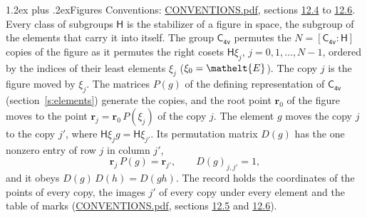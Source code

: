 \documentclass[10pt,a4paper]{article}
\makeatletter
\renewcommand\section{\@startsection{section}{1}{\z@}{-3ex plus -1ex minus -.2ex}%
  {1.2ex plus .2ex}{\normalfont\large\sffamily\bfseries\color{parttitle}}}
\numberwithin{equation}{section}
\newcommand{\eltfont}[1]{{\let\sigma\eltsigma\mathelt{#1}}}
\newcommand{\grp}[1]{\mathsf{#1}}
\newcommand{\cls}[1]{\eltfont{#1}}
\newcommand{\pointr}{\mathbf{r}}
\makeatother
\begin{document}
\section{Figures}\label{s:permutation}
Conventions: \href{../../CONVENTIONS.pdf}{CONVENTIONS.pdf}, sections \href{../../CONVENTIONS.pdf\#conv.12.4}{12.4} to \href{../../CONVENTIONS.pdf\#conv.12.6}{12.6}.
Every class of subgroups $\grp{H}$ is the stabilizer of a figure in space, the subgroup of the elements that carry it into itself. \label{n:local.orbit.size}\label{n:element.coset.least}\label{n:index.coset}The group $\grp{C_{4v}}$ permutes the $N = [\grp{C_{4v}} : \grp{H}]$ copies of the figure as it permutes the right cosets $\grp{H}\xi_j$, $j = 0, 1, \dots, N - 1$, ordered by the indices of their least elements $\xi_j$ ($\xi_0 = \cls{E}$). The copy $j$ is the figure moved by $\xi_j$. The matrices $P(g)$ of the defining representation of $\grp{C_{4v}}$ (section~\ref{s:elements}) generate the copies, and the root point $\pointr_0$ of the figure moves to the point $\pointr_j = \pointr_0\, P(\xi_j)$ of the copy $j$. \label{n:local.coset.image}The element $g$ moves the copy $j$ to the copy $j'$, where $\grp{H}\xi_j g = \grp{H}\xi_{j'}$. \label{n:local.matrix.permutation}Its permutation matrix $D(g)$ has the one nonzero entry of row $j$ in column $j'$,
\begin{equation}\label{e:perm.matrix}\pointr_j\, P(g) = \pointr_{j'}, \qquad D(g)_{j,j'} = 1,\end{equation}
and it obeys $D(g)\, D(h) = D(gh)$. The record holds the coordinates of the points of every copy, the images $j'$ of every copy under every element and the table of marks (\href{../../CONVENTIONS.pdf}{CONVENTIONS.pdf}, sections \href{../../CONVENTIONS.pdf\#conv.12.5}{12.5} and \href{../../CONVENTIONS.pdf\#conv.12.6}{12.6}).
\end{document}
